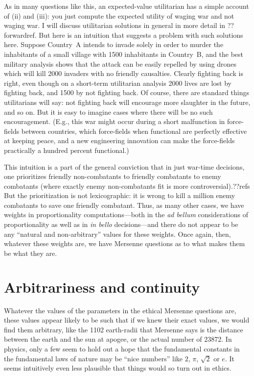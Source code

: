 As in many questions like this, 
an expected-value utilitarian has a simple account of (ii) and (iii): you just compute the expected utility 
of waging war and not waging war. I will discuss utilitarian solutions in general in more detail in ??forwardref. 
But here is an intuition that suggests a problem with such solutions here. Suppose Country~A intends
to invade solely in order to murder the inhabitants of a small village with 1500 inhabitants in Country~B, 
and the best military analysis shows that the attack can be easily repelled by using drones which will 
kill 2000 invaders with no friendly causalties. Clearly fighting back is right, even though on a short-term
utilitarian analysis 2000 lives are lost by fighting back, and 1500 by not fighting back. Of course, there 
are standard things utilitarians will say: not fighting back will encourage more slaughter in the future,
and so on. But it is easy to imagine cases where there will be no such encouragement. (E.g., this war might occur
during a short malfunction in force-fields between countries, which force-fields when functional are perfectly 
effective at keeping peace, and a new engineering innovation can make the force-fields practically a hundred
percent functional.)

This intuition is a part of the general conviction that in just war-time decisions, one prioritizes friendly non-combatants
to friendly combatants to enemy combatants (where exactly enemy non-combatants fit is more controversial).??refs
But the prioritization is not lexicographic: it is wrong to kill a million enemy combatants to save one friendly combatant.
Thus, as many other cases, we have weights in proportionality computations---both in the \textit{ad bellum} considerations of 
proportionality as well as in \textit{in bello} decisions---and there do not appear to be any ``natural and non-arbitrary''
values for these weights. Once again, then, whatever these weights are, we have Mersenne questions as to what makes them 
be what they are.

\section{Arbitrariness and continuity}
Whatever the values of the parameters in the ethical Mersenne questions are, these values appear likely to be such 
that if we knew their exact values, we would find them arbitrary, like the 1102 earth-radii that Mersenne says
is the distance between the earth and the sun at apogee, or the actual number of 23872.
In physics, only a few seem to hold out a hope that the fundamental constants in the fundamental laws of nature may be ``nice numbers'' like
$2$, $\pi$, $\sqrt 2$ or $e$. It seems intuitively even less plausible that things would so turn out in ethics. 

